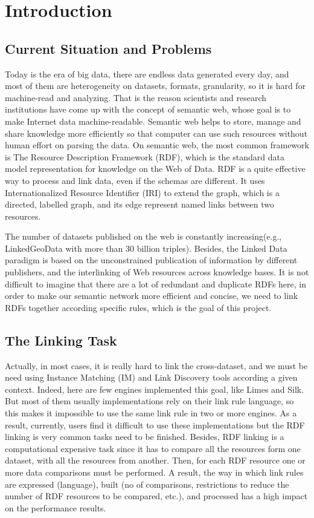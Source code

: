 \chapter{Introduction}

\section{Current Situation and Problems}

Today is the era of big data, there are endless data generated every day, and most of them are heterogeneity on datasets, formats, granularity, so it is hard for machine-read and analyzing. That is the reason scientists and research institutions have come up with the concept of semantic web, whose goal is to make Internet data machine-readable. Semantic web helps to store, manage and share knowledge more efficiently so that computer can use such resources without human effort on parsing the data. On semantic web, the most common framework is The Resource Description Framework (RDF), which is the standard data model representation for knowledge on the Web of Data. RDF is a quite effective way to process and link data, even if the schemas are different. It uses Internationalized Resource Identifier (IRI) to extend the graph, which is a directed, labelled graph, and its edge represent named links between two resources. 

The number of datasets published on the web is constantly increasing(e.g., LinkedGeoData with more than 30 billion triples). Besides, the Linked Data paradigm is based on the unconstrained publication of information by different publishers, and the interlinking of Web resources across knowledge bases. It is not difficult to imagine that there are a lot of redundant and duplicate RDFs here, in order to make our semantic network more efficient and concise, we need to link RDFs together according specific rules, which is the goal of this project.



\section{The Linking Task}

Actually, in most cases, it is really hard to link the cross-dataset, and we must be need using Instance Matching (IM) and Link Discovery tools according a given context. Indeed, here are few engines implemented this goal, like Limes and Silk. But most of them usually implementations rely on their link rule language, so this makes it impossible to use the same link rule in two or more engines. As a result, currently, users find it difficult to use these implementations but the RDF linking is very common tasks need to be finished. Besides, RDF linking is a computational expensive task since it has to compare all the resources form one dataset, with all the resources from another. Then, for each RDF resource one or more data comparisons must be performed. A result, the way in which link rules are expressed (language), built (no of comparisons, restrictions to reduce the number of RDF resources to be compared, etc.), and processed has a high impact on the performance results.

